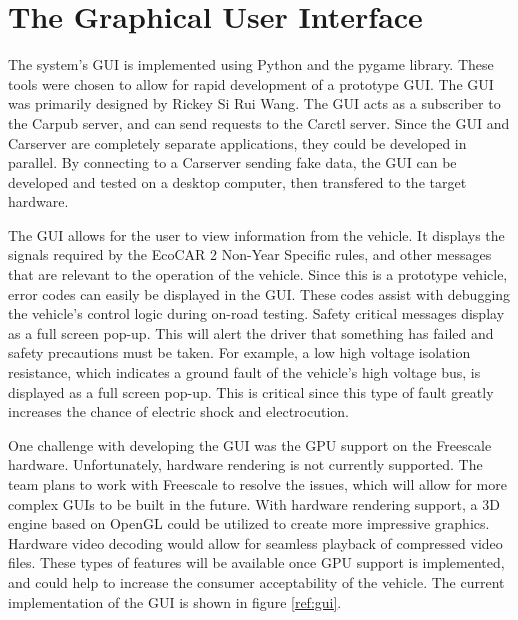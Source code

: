 \documentclass[ece]{uw-wkrpt}
\begin{document}
\section{The Graphical User Interface}

The system's GUI is implemented using Python and the pygame library.
These tools were chosen to allow for rapid development of a prototype GUI. The
GUI was primarily designed by Rickey Si Rui Wang. The GUI acts as a subscriber
to the Carpub server, and can send requests to the Carctl server.
Since the GUI and Carserver are completely separate applications, they could be
developed in parallel. By connecting to a Carserver sending fake data,
the GUI can be developed and tested on a desktop computer, then transfered to
the target hardware.

The GUI allows for the user to view information from the vehicle. It displays
the signals required by the EcoCAR 2 Non-Year Specific rules, and other messages
that are relevant to the operation of the vehicle. Since this is a prototype
vehicle, error codes can easily be displayed in the GUI. These codes assist with
debugging the vehicle's control logic during on-road testing. Safety critical
messages display as a full screen pop-up. This will alert the driver that
something has failed and safety precautions must be taken. For example, a low
high voltage isolation resistance, which indicates a ground fault of the
vehicle's high voltage bus, is displayed as a full screen pop-up. This is
critical since this type of fault greatly increases the chance of electric
shock and electrocution.

One challenge with developing the GUI was the GPU support on the Freescale
hardware. Unfortunately, hardware rendering is not currently supported. The team
plans to work with Freescale to resolve the issues, which will allow for more
complex GUIs to be built in the future. With hardware rendering support, a 3D
engine based on OpenGL could be utilized to create more impressive graphics.
Hardware video decoding would allow for seamless playback of compressed video
files. These types of features will be available once GPU support is
implemented, and could help to increase the consumer acceptability of the
vehicle. The current implementation of the GUI is shown in figure \ref{ref:gui}.
\end{document}
